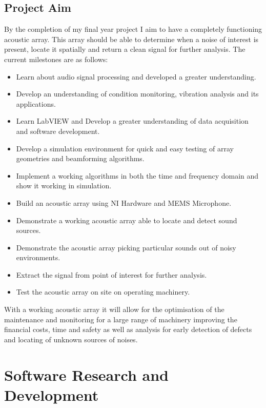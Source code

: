 \documentclass{UoNMCHA}
\numberwithin{equation}{section}
\begin{document}
\subsection{Project Aim} \label{sec:Project  Aim}
    By the completion of my final year project I aim to have a completely functioning acoustic array. This array should be able to determine when a noise of interest is present, locate it spatially and return a clean signal for further analysis. The current milestones are as follows:
    
    \begin{itemize}
        \item Learn about audio signal processing and developed a greater understanding.
        \item Develop an understanding of condition monitoring, vibration analysis and its applications.
        \item Learn LabVIEW and Develop a greater understanding of data acquisition and software development.
        \item Develop a simulation environment for quick and easy testing of array geometries and beamforming algorithms.
        \item Implement a working algorithms in both the time and frequency domain and show it working in simulation.
        \item Build an acoustic array using NI Hardware and MEMS Microphone.
        \item Demonstrate a working acoustic array able to locate and detect sound sources.
        \item Demonstrate the acoustic array picking particular sounds out of noisy environments.
        \item Extract the signal from point of interest for further analysis.
        \item Test the acoustic array on site on operating machinery.
    \end{itemize}
    
    With a working acoustic array it will allow for the optimisation of the maintenance and monitoring for a large range of machinery improving the financial costs, time and safety as well as analysis for early detection of defects and locating of unknown sources of noises.
\newpage
\section{Software Research and Development} \label{sec:Software}
\end{document}
